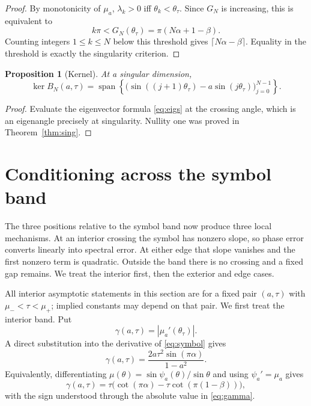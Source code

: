 \documentclass[11pt,reqno]{amsart}
\theoremstyle{plain}
\newtheorem{proposition}[theorem]{Proposition}
\theoremstyle{definition}
\newcommand{\BN}{B_N}
\begin{document}
\begin{proof}
By monotonicity of $\mu_a$, $\lambda_k>0$ iff $\theta_k<\theta_\tau$.  Since $G_N$
is increasing, this is equivalent to
\[
k\pi<G_N(\theta_\tau)
=\pi(N\alpha+1-\beta).
\]
Counting integers $1\le k\le N$ below this threshold gives
$\lceil N\alpha-\beta\rceil$.  Equality in the threshold is exactly the singularity
criterion.
\end{proof}

\begin{proposition}[Kernel]\label{prop:kernel}
At a singular dimension,
\begin{equation}\label{eq:kernel}
\ker\BN(a,\tau)
=\operatorname{span}\left\{
\bigl(\sin((j+1)\theta_\tau)-a\sin(j\theta_\tau)\bigr)_{j=0}^{N-1}
\right\}.
\end{equation}
\end{proposition}

\begin{proof}
Evaluate the eigenvector formula \eqref{eq:eigs} at the crossing angle, which is an
eigenangle precisely at singularity.  Nullity one was proved in
Theorem~\ref{thm:sing}.
\end{proof}

\section{Conditioning across the symbol band}\label{sec:conditioning}

The three positions relative to the symbol band now produce three local mechanisms.
At an interior crossing the symbol has nonzero slope, so phase error converts
linearly into spectral error.  At either edge that slope vanishes and the first
nonzero term is quadratic.  Outside the band there is no crossing and a fixed gap
remains.  We treat the interior first, then the exterior and edge cases.

All interior asymptotic statements in this section are for a fixed pair
$(a,\tau)$ with $\mu_-<\tau<\mu_+$; implied constants may depend on that pair.
We first treat the interior band.  Put
\begin{equation}\label{eq:gamma}
\gamma(a,\tau)=|\mu_a'(\theta_\tau)|.
\end{equation}
A direct substitution into the derivative of \eqref{eq:symbol} gives
\begin{equation}\label{eq:gamma-form}
\boxed{
\gamma(a,\tau)
=\frac{2a\tau^2\sin(\pi\alpha)}{1-a^2}.}
\end{equation}
Equivalently, differentiating
$\mu(\theta)=\sin\psi_a(\theta)/\sin\theta$ and using $\psi_a'=\mu_a$ gives
\begin{equation}\label{eq:gamma-phase}
\gamma(a,\tau)
=\tau\bigl(\cot(\pi\alpha)-\tau\cot(\pi(1-\beta))\bigr),
\end{equation}
with the sign understood through the absolute value in \eqref{eq:gamma}.
\end{document}
